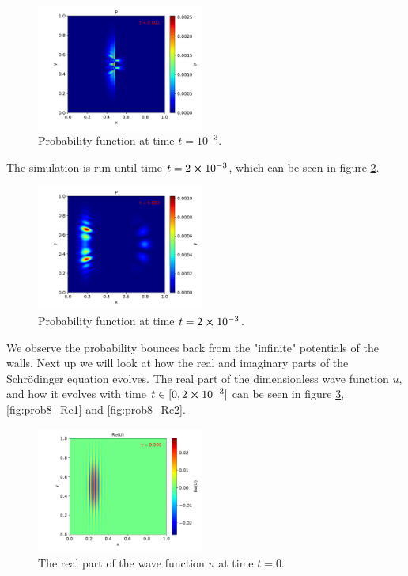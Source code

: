 \documentclass[english,notitlepage,reprint,nofootinbib]{revtex4-2}  %
\begin{document}
	\begin{figure}[H]
		\centering
		\includegraphics[width=0.49\textwidth]{figures/problem8_P_0.001.pdf}
		\caption{Probability function at time $t=10^{-3}$.}
		\label{fig:prob8_P1}
	\end{figure}
	The simulation is run until time $t=2\cross10^{-3}$, which can be seen in figure \ref{fig:prob8_P2}.

	\begin{figure}[H]
		\centering
		\includegraphics[width=0.49\textwidth]{figures/problem8_P_0.002.pdf}
		\caption{Probability function at time $t=2\cross10^{-3}$.}
		\label{fig:prob8_P2}
	\end{figure}
	We observe the probability bounces back from the "infinite" potentials of the walls. Next up we will look at how the real and imaginary parts of the Schrödinger equation evolves. The real part of the dimensionless wave function $u$, and how it evolves with time $t \in[0, 2\cross10^{-3}]$ can be seen in figure \ref{fig:prob8_Re0}, \ref{fig:prob8_Re1} and \ref{fig:prob8_Re2}.

	\begin{figure}[H]
		\centering
		\includegraphics[width=0.49\textwidth]{figures/problem8_U_Re_0.000.pdf}
		\caption{The real part of the wave function $u$ at time $t = 0$.}
		\label{fig:prob8_Re0}
	\end{figure}
\end{document}
